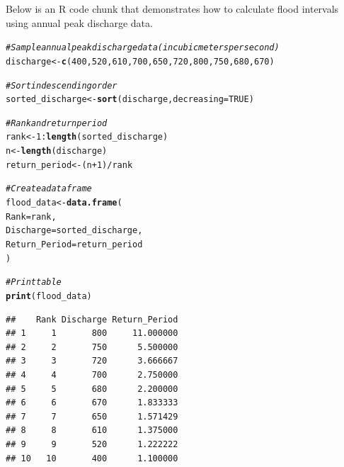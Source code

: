 \documentclass{tufte-handout}\usepackage[]{graphicx}\usepackage[]{xcolor}
\makeatletter
\newcommand{\hlnum}[1]{\textcolor[rgb]{0.686,0.059,0.569}{#1}}%
\newcommand{\hlcom}[1]{\textcolor[rgb]{0.678,0.584,0.686}{\textit{#1}}}%
\newcommand{\hlopt}[1]{\textcolor[rgb]{0,0,0}{#1}}%
\newcommand{\hlstd}[1]{\textcolor[rgb]{0.345,0.345,0.345}{#1}}%
\newcommand{\hlkwb}[1]{\textcolor[rgb]{0.69,0.353,0.396}{#1}}%
\newcommand{\hlkwc}[1]{\textcolor[rgb]{0.333,0.667,0.333}{#1}}%
\newcommand{\hlkwd}[1]{\textcolor[rgb]{0.737,0.353,0.396}{\textbf{#1}}}%
\newenvironment{kframe}{%
 \def\at@end@of@kframe{}%
 \ifinner\ifhmode%
  \def\at@end@of@kframe{\end{minipage}}%
  \begin{minipage}{\columnwidth}%
 \fi\fi%
 \def\FrameCommand##1{\hskip\@totalleftmargin \hskip-\fboxsep
 \colorbox{shadecolor}{##1}\hskip-\fboxsep
     \hskip-\linewidth \hskip-\@totalleftmargin \hskip\columnwidth}%
 \MakeFramed {\advance\hsize-\width
   \@totalleftmargin\z@ \linewidth\hsize
   \@setminipage}}%
 {\par\unskip\endMakeFramed%
 \at@end@of@kframe}
\newenvironment{knitrout}{}{} %
\makeatother
\begin{document}
Below is an R code chunk that demonstrates how to calculate flood intervals using annual peak discharge data.

\begin{knitrout}
\color{fgcolor}\begin{kframe}
\begin{alltt}
\hlcom{# Sample annual peak discharge data (in cubic meters per second)}
\hlstd{discharge} \hlkwb{<-} \hlkwd{c}\hlstd{(}\hlnum{400}\hlstd{,} \hlnum{520}\hlstd{,} \hlnum{610}\hlstd{,} \hlnum{700}\hlstd{,} \hlnum{650}\hlstd{,} \hlnum{720}\hlstd{,} \hlnum{800}\hlstd{,} \hlnum{750}\hlstd{,} \hlnum{680}\hlstd{,} \hlnum{670}\hlstd{)}

\hlcom{# Sort in descending order}
\hlstd{sorted_discharge} \hlkwb{<-} \hlkwd{sort}\hlstd{(discharge,} \hlkwc{decreasing} \hlstd{=} \hlnum{TRUE}\hlstd{)}

\hlcom{# Rank and return period}
\hlstd{rank} \hlkwb{<-} \hlnum{1}\hlopt{:}\hlkwd{length}\hlstd{(sorted_discharge)}
\hlstd{n} \hlkwb{<-} \hlkwd{length}\hlstd{(discharge)}
\hlstd{return_period} \hlkwb{<-} \hlstd{(n} \hlopt{+} \hlnum{1}\hlstd{)} \hlopt{/} \hlstd{rank}

\hlcom{# Create a data frame}
\hlstd{flood_data} \hlkwb{<-} \hlkwd{data.frame}\hlstd{(}
  \hlkwc{Rank} \hlstd{= rank,}
  \hlkwc{Discharge} \hlstd{= sorted_discharge,}
  \hlkwc{Return_Period} \hlstd{= return_period}
\hlstd{)}
\end{alltt}
\end{kframe}
\end{knitrout}


\begin{knitrout}
\color{fgcolor}\begin{kframe}
\begin{alltt}
\hlcom{# Print table}
\hlkwd{print}\hlstd{(flood_data)}
\end{alltt}
\begin{verbatim}
##    Rank Discharge Return_Period
## 1     1       800     11.000000
## 2     2       750      5.500000
## 3     3       720      3.666667
## 4     4       700      2.750000
## 5     5       680      2.200000
## 6     6       670      1.833333
## 7     7       650      1.571429
## 8     8       610      1.375000
## 9     9       520      1.222222
## 10   10       400      1.100000
\end{verbatim}
\end{kframe}
\end{knitrout}
\end{document}
